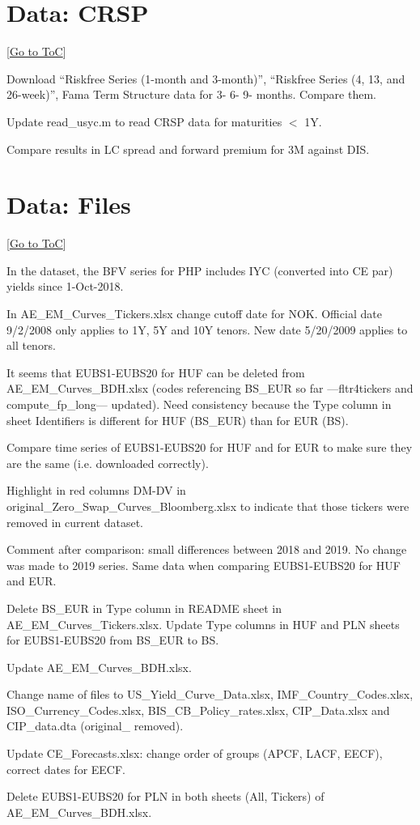 \documentclass[12pt]{article}
\newcommand{\gototoc}{\vspace{-1.8cm} \null\hfill [\hyperlink{toc}{Go to ToC}] \newline}
\newcommand{\cmark}{\ding{51}}
\newcommand{\done}{\rlap{$\square$}{\raisebox{2pt}{\large\hspace{1pt}\cmark}}%
	\hspace{-2.5pt}}
\begin{document}
\section{Data: CRSP}
\gototoc
\begin{todolist}
	\item[\done] Download “Riskfree Series (1-month and 3-month)”, “Riskfree Series (4, 13, and 26-week)”, Fama Term Structure data for 3- 6- 9- months. Compare them.
	\item[\done] Update read_usyc.m to read CRSP data for maturities $<$ 1Y.
	\item[\done] Compare results in LC spread and forward premium for 3M against DIS.
\end{todolist}

\section{Data: Files}
\gototoc
\begin{todolist}
	\item[\done] In the dataset, the BFV series for PHP includes IYC (converted into CE par) yields since 1-Oct-2018. 
	\item[\done] In AE_EM_Curves_Tickers.xlsx change cutoff date for NOK. Official date 9/2/2008 only applies to 1Y, 5Y and 10Y tenors. New date 5/20/2009 applies to all tenors.
	\item[\done] It seems that EUBS1-EUBS20 for HUF can be deleted from AE_EM_Curves_BDH.xlsx (codes referencing BS_EUR so far ---fltr4tickers and compute_fp_long--- updated). Need consistency because the Type column in sheet Identifiers is different for HUF (BS_EUR) than for EUR (BS). 
	\begin{todolist}
		\item[\done] Compare time series of EUBS1-EUBS20 for HUF and for EUR to make sure they are the same (i.e. downloaded correctly).
		\item[\done] Highlight in red columns DM-DV in original_Zero_Swap_Curves_Bloomberg.xlsx to indicate that those tickers were removed in current dataset.
		\item[\done] Comment after comparison: small differences between 2018 and 2019. No change was made to 2019 series. Same data when comparing EUBS1-EUBS20 for HUF and EUR.
		\item[\done] Delete BS_EUR in Type column in README sheet in AE_EM_Curves_Tickers.xlsx. Update Type columns in HUF and PLN sheets for EUBS1-EUBS20 from BS_EUR to BS.
		\item[\done] Update AE_EM_Curves_BDH.xlsx.
	\end{todolist}
	\item[\done] Change name of files to US_Yield_Curve_Data.xlsx, IMF_Country_Codes.xlsx, ISO_Currency_Codes.xlsx, BIS_CB_Policy_rates.xlsx, CIP_Data.xlsx and CIP_data.dta (original_ removed).
	\item[\done] Update CE_Forecasts.xlsx: change order of groups (APCF, LACF, EECF), correct dates for EECF.
	\item[\done] Delete EUBS1-EUBS20 for PLN in both sheets (All, Tickers) of AE_EM_Curves_BDH.xlsx.
\end{todolist}
\end{document}
